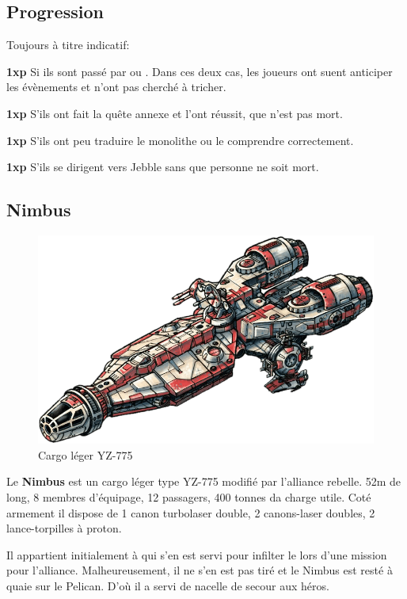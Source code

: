\subsection{Progression}
Toujours à titre indicatif:
\begin{rebelist}
    \item \textbf{1xp} Si ils sont passé par  ou . Dans ces deux cas, les joueurs ont suent anticiper les évènements et n’ont pas cherché à tricher.
    \item \textbf{1xp} S’ils ont fait la quête annexe et l’ont réussit, que  n’est pas mort.
    \item \textbf{1xp} S’ils ont peu traduire le monolithe ou le comprendre correctement.
    \item \textbf{1xp} S’ils se dirigent vers Jebble sans que personne ne soit mort.
\end{rebelist}

\newpage
\subsection{Nimbus} \label{sec:nimbus}
\vspace{-4\baselineskip}
\begin{figure}[h!]
    \centering
    \includegraphics[width=\linewidth]{_img/dos-au-muur/nimbus.png}
    \caption{Cargo léger YZ-775}
\end{figure}

Le \textbf{Nimbus} est un cargo léger type YZ-775 modifié par l’alliance rebelle. 52m de long, 8 membres d’équipage, 12 passagers, 400 tonnes da charge utile. Coté armement il dispose de 1 canon turbolaser double, 2 canons-laser doubles, 2 lance-torpilles à proton.

Il appartient initialement à  qui s’en est servi pour infilter le  lors d’une mission pour l’alliance. Malheureusement, il ne s’en est pas tiré et le Nimbus est resté à quaie sur le Pelican. D’où il a servi de nacelle de secour aux héros.
